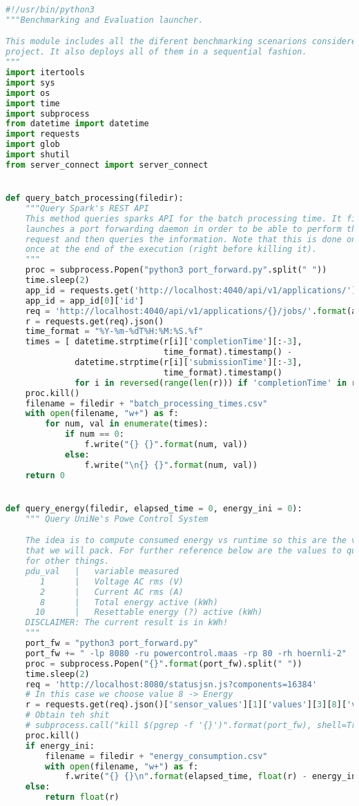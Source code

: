 \begin{lstlisting}[language=Python,caption={Benchmarking and Experiment Deployment Script.},label=code:deployment:experiments]
#!/usr/bin/python3
"""Benchmarking and Evaluation launcher.

This module includes all the diferent benchmarking scenarions considered in the
project. It also deploys all of them in a sequential fashion.
"""
import itertools
import sys
import os
import time
import subprocess
from datetime import datetime
import requests
import glob
import shutil
from server_connect import server_connect


def query_batch_processing(filedir):
    """Query Spark's REST API 
    This method queries sparks API for the batch processing time. It firsts
    launches a port forwarding daemon in order to be able to perform the
    request and then queries the information. Note that this is done only
    once at the end of the execution (right before killing it).
    """
    proc = subprocess.Popen("python3 port_forward.py".split(" "))
    time.sleep(2)
    app_id = requests.get('http://localhost:4040/api/v1/applications/').json()
    app_id = app_id[0]['id']
    req = 'http://localhost:4040/api/v1/applications/{}/jobs/'.format(app_id)
    r = requests.get(req).json()
    time_format = "%Y-%m-%dT%H:%M:%S.%f"
    times = [ datetime.strptime(r[i]['completionTime'][:-3],
                                time_format).timestamp() -
              datetime.strptime(r[i]['submissionTime'][:-3],
                                time_format).timestamp()
              for i in reversed(range(len(r))) if 'completionTime' in r[i] ]
    proc.kill()
    filename = filedir + "batch_processing_times.csv"
    with open(filename, "w+") as f:
        for num, val in enumerate(times):
            if num == 0:
                f.write("{} {}".format(num, val))
            else:
                f.write("\n{} {}".format(num, val))
    return 0


def query_energy(filedir, elapsed_time = 0, energy_ini = 0):
    """ Query UniNe's Powe Control System

    The idea is to compute consumed energy vs runtime so this are the values
    that we will pack. For further reference below are the values to query
    for other things.
    pdu_val   |   variable measured
       1      |   Voltage AC rms (V)
       2      |   Current AC rms (A)
       8      |   Total energy active (kWh)
      10      |   Resettable energy (?) active (kWh)
    DISCLAIMER: The current result is in kWh!
    """
    port_fw = "python3 port_forward.py"
    port_fw += " -lp 8080 -ru powercontrol.maas -rp 80 -rh hoernli-2"
    proc = subprocess.Popen("{}".format(port_fw).split(" "))
    time.sleep(2)
    req = 'http://localhost:8080/statusjsn.js?components=16384'
    # In this case we choose value 8 -> Energy
    r = requests.get(req).json()['sensor_values'][1]['values'][3][8]['v']
    # Obtain teh shit
    # subprocess.call("kill $(pgrep -f '{}')".format(port_fw), shell=True)
    proc.kill()
    if energy_ini:
        filename = filedir + "energy_consumption.csv"
        with open(filename, "w+") as f:
            f.write("{} {}\n".format(elapsed_time, float(r) - energy_ini))
    else:
        return float(r)



\end{lstlisting}
